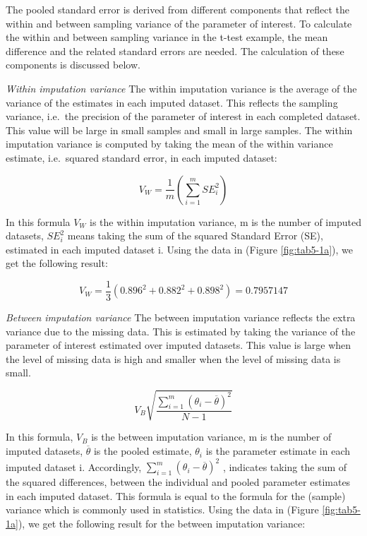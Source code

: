 \documentclass[]{book}
\theoremstyle{definition}
\theoremstyle{definition}
\theoremstyle{definition}
\theoremstyle{remark}
\begin{document}
The pooled standard error is derived from different components that
reflect the within and between sampling variance of the parameter of
interest. To calculate the within and between sampling variance in the
t-test example, the mean difference and the related standard errors are
needed. The calculation of these components is discussed below.

\emph{Within imputation variance} The within imputation variance is the
average of the variance of the estimates in each imputed dataset. This
reflects the sampling variance, i.e.~the precision of the parameter of
interest in each completed dataset. This value will be large in small
samples and small in large samples. The within imputation variance is
computed by taking the mean of the within variance estimate,
i.e.~squared standard error, in each imputed dataset:

\begin{equation}
V_W = \frac{1}{m}\left (\sum_{i=1}^m{SE_i^2}\right )
  \label{eq:var-w}
\end{equation}

In this formula \(V_W\) is the within imputation variance, m is the
number of imputed datasets, \(SE_i^2\) means taking the sum of the
squared Standard Error (SE), estimated in each imputed dataset i. Using
the data in (Figure \ref{fig:tab5-1a}), we get the following result:

\[V_W = \frac{1}{3}(0.896^2 + 0.882^2 + 0.898^2)=0.7957147\]

\emph{Between imputation variance} The between imputation variance
reflects the extra variance due to the missing data. This is estimated
by taking the variance of the parameter of interest estimated over
imputed datasets. This value is large when the level of missing data is
high and smaller when the level of missing data is small.

\begin{equation}
V_B\sqrt{\frac{\sum_{i=1}^m (\theta_i - \overline{\theta})^2}{N-1} }
  \label{eq:var-b}
\end{equation}

In this formula, \(V_B\) is the between imputation variance, m is the
number of imputed datasets, \(\overline{\theta}\) is the pooled
estimate, \(\theta_i\) is the parameter estimate in each imputed dataset
i. Accordingly, \({\sum_{i=1}^m(\theta_i - \overline{\theta})^2}\) ,
indicates taking the sum of the squared differences, between the
individual and pooled parameter estimates in each imputed dataset. This
formula is equal to the formula for the (sample) variance which is
commonly used in statistics. Using the data in (Figure
\ref{fig:tab5-1a}), we get the following result for the between
imputation variance:
\end{document}
